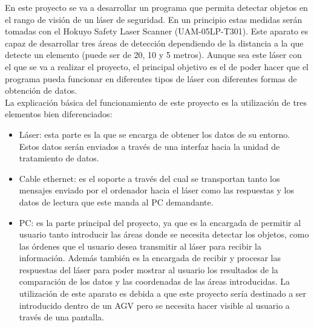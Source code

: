 
En este proyecto se va a desarrollar un programa que permita detectar objetos en el rango de visión de un láser de seguridad. En un principio estas medidas serán tomadas con el Hokuyo Safety Laser Scanner (UAM-05LP-T301). Este aparato es capaz de desarrollar tres áreas de detección dependiendo de la distancia a la que detecte un elemento (puede ser de 20, 10 y 5 metros). Aunque sea este láser con el que se va a realizar el proyecto, el principal objetivo es el de poder hacer que el programa pueda funcionar en diferentes tipos de láser con diferentes formas de obtención de datos.\\
La explicación básica del funcionamiento de este proyecto es la utilización de tres elementos bien diferenciados:
\begin{itemize}
    \item Láser: esta parte es la que se encarga de obtener los datos de su entorno. Estos datos serán enviados a través de una interfaz hacia la unidad de tratamiento de datos.
    \item Cable ethernet: es el soporte a través del cual se transportan tanto los mensajes enviado por el ordenador hacia el láser como las respuestas y los datos de lectura que este manda al PC demandante.
    \item PC: es la parte principal del proyecto, ya que es la encargada de permitir al usuario tanto introducir las áreas donde se necesita detectar los objetos, como las órdenes que el usuario desea transmitir al láser para recibir la información. Además también es la encargada de recibir y procesar las respuestas del láser para poder mostrar al usuario los resultados de la comparación de los datos y las coordenadas de las áreas introducidas. La utilización de este aparato es debida a que este proyecto sería destinado a ser introducido dentro de un AGV pero se necesita hacer visible al usuario a través de una pantalla.\\
\end{itemize}


